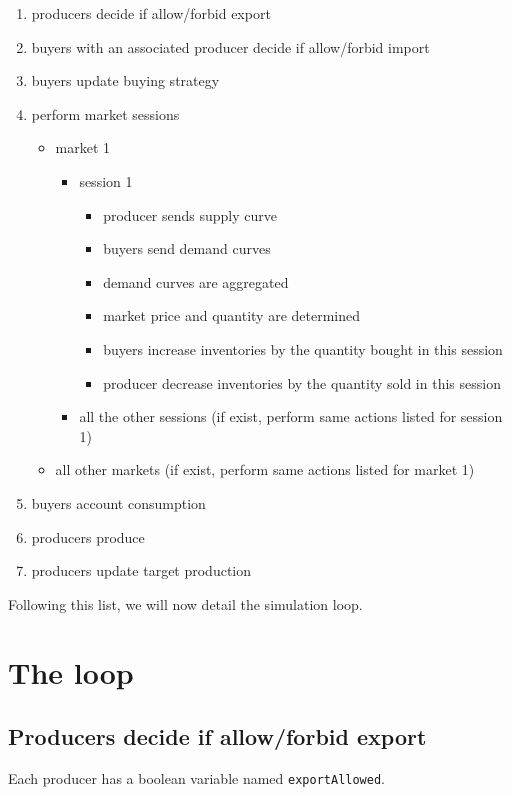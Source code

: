 \documentclass{article}
\begin{document}
\begin{enumerate}
	\item producers decide if allow/forbid export
	\item buyers with an associated producer decide if allow/forbid import
	\item buyers update buying strategy
	\item perform market sessions
		\begin{itemize}
			\item market 1
				\begin{itemize}
				\item session 1 
					\begin{itemize}
						\item producer sends supply curve
						\item buyers send demand curves
						\item demand curves are aggregated 
						\item market price and quantity are determined
						\item buyers increase inventories by the quantity bought in this session
						\item producer decrease inventories by the quantity sold in this session
					\end{itemize}
				\item all the other sessions (if exist, perform same actions listed for session 1)
				\end{itemize}
			\item  all other markets (if exist, perform same actions listed for market 1)
		\end{itemize}
	\item buyers account consumption
	\item producers produce
	\item producers update target production
\end{enumerate}

Following this list, we will now detail the simulation loop. 

\section{The loop}

\subsection{Producers decide if allow/forbid export}

Each producer has a boolean variable named \verb+exportAllowed+. 
\end{document}
